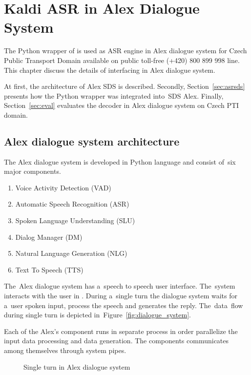 \chapter{Kaldi \acs{ASR} in Alex Dialogue System}
\label{cha:integration}

The Python wrapper of  is used as \ac{ASR} engine in Alex dialogue system for Czech Public Transport Domain available on public toll-free (+420) 800 899 998 line.
This chapter discuss the details of interfacing  in Alex dialogue system.

At first, the architecture of Alex \ac{SDS} is described.
Secondly, Section~\ref{sec:asrsds} presents how the Python wrapper  was integrated into~\ac{SDS} Alex.
Finally, Section~\ref{sec:eval} evaluates the decoder in Alex dialogue system on Czech \ac{PTI} domain. 

\section{Alex dialogue system architecture} 
\label{sec:arch}
The Alex dialogue system is developed in Python language and consist of~six major components. 
\begin{enumerate}
    \item Voice Activity Detection (VAD)
    \item Automatic Speech Recognition (ASR) 
    \item Spoken Language Understanding (SLU)
    \item Dialog Manager (DM)
    \item Natural Language Generation (NLG)
    \item Text To Speech (TTS)
\end{enumerate}
The~Alex dialogue system has a~speech to speech user interface. 
The~system interacts with the user in . 
During a~single turn the dialogue system waits for a~user spoken input, process the speech and generates the reply.
The~data~flow during single turn is depicted in~Figure~\ref{fig:dialogue_system}.

Each of the Alex's component runs in separate process in order parallelize the input data processing and data generation.
The components communicates among themselves through system pipes.

\begin{figure}
    \begin{center}
    
    \caption{Single turn in Alex dialogue system}
    \label{fig:alex} 
    \end{center}
\end{figure}

